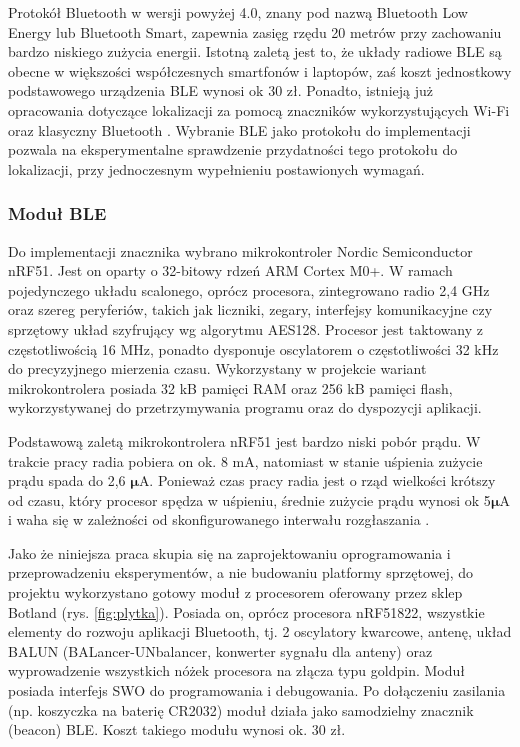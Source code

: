 Protokół Bluetooth w wersji powyżej 4.0, znany pod nazwą Bluetooth Low Energy lub Bluetooth Smart, zapewnia zasięg rzędu 20 metrów przy zachowaniu bardzo niskiego zużycia energii. Istotną zaletą jest to, że układy radiowe BLE są obecne w większości współczesnych smartfonów i laptopów, zaś koszt jednostkowy podstawowego urządzenia BLE wynosi ok 30 zł. Ponadto, istnieją już opracowania dotyczące lokalizacji za pomocą znaczników wykorzystujących Wi-Fi \cite{trilat_iter} oraz klasyczny Bluetooth \cite{trilat_particle}. Wybranie BLE jako protokołu do implementacji pozwala na eksperymentalne sprawdzenie przydatności tego protokołu do lokalizacji, przy jednoczesnym wypełnieniu postawionych wymagań. 

\subsubsection{Moduł BLE}
Do implementacji znacznika wybrano mikrokontroler Nordic Semiconductor nRF51. Jest on oparty o 32-bitowy rdzeń ARM Cortex M0+. W ramach pojedynczego układu scalonego, oprócz procesora, zintegrowano radio 2,4 GHz oraz szereg peryferiów, takich jak liczniki, zegary, interfejsy komunikacyjne czy sprzętowy układ szyfrujący wg algorytmu AES128. Procesor jest taktowany z częstotliwością 16 MHz, ponadto dysponuje oscylatorem o częstotliwości 32 kHz do precyzyjnego mierzenia czasu. Wykorzystany w projekcie wariant mikrokontrolera posiada 32 kB pamięci RAM oraz 256 kB pamięci flash, wykorzystywanej do przetrzymywania programu oraz do dyspozycji aplikacji. 

Podstawową zaletą mikrokontrolera nRF51 jest bardzo niski pobór prądu. W trakcie pracy radia pobiera on ok. 8 mA, natomiast w stanie uśpienia zużycie prądu spada do 2,6 $\mathbf{\mu}$A. Ponieważ czas pracy radia jest o rząd wielkości krótszy od czasu, który procesor spędza w uśpieniu, średnie zużycie prądu wynosi ok 5$\mathbf{\mu}$A i waha się w zależności od skonfigurowanego interwału rozgłaszania \cite{nordic}. 

Jako że niniejsza praca skupia się na zaprojektowaniu oprogramowania i przeprowadzeniu eksperymentów, a nie budowaniu platformy sprzętowej, do projektu wykorzystano gotowy moduł z procesorem oferowany przez sklep Botland (rys. \ref{fig:plytka}). Posiada on, oprócz procesora nRF51822, wszystkie elementy do rozwoju aplikacji Bluetooth, tj. 2 oscylatory kwarcowe, antenę, układ BALUN (BALancer-UNbalancer, konwerter sygnału dla anteny) oraz wyprowadzenie wszystkich nóżek procesora na złącza typu goldpin. Moduł posiada interfejs SWO do programowania i debugowania. Po dołączeniu zasilania (np. koszyczka na baterię CR2032) moduł działa jako samodzielny znacznik (beacon) BLE. Koszt takiego modułu wynosi ok. 30 zł.

